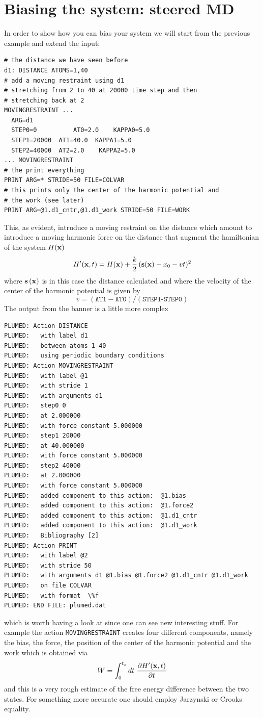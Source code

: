 \documentclass[10pt,fleqn,a4paper]{report}
\begin{document}
\chapter{Biasing the system: steered MD}
In order to show how you can bias your system we will start from the previous example and extend the input:
\begin{verbatim}
# the distance we have seen before
d1: DISTANCE ATOMS=1,40
# add a moving restraint using d1
# stretching from 2 to 40 at 20000 time step and then 
# stretching back at 2
MOVINGRESTRAINT ...
  ARG=d1
  STEP0=0          AT0=2.0    KAPPA0=5.0
  STEP1=20000  AT1=40.0  KAPPA1=5.0
  STEP2=40000  AT2=2.0    KAPPA2=5.0
... MOVINGRESTRAINT
# the print everything
PRINT ARG=* STRIDE=50 FILE=COLVAR
# this prints only the center of the harmonic potential and 
# the work (see later)
PRINT ARG=@1.d1_cntr,@1.d1_work STRIDE=50 FILE=WORK
\end{verbatim}
This, as evident, intruduce a moving restraint on the distance which amount to introduce a moving harmonic force on the distance that augment the hamiltonian of the system $H({\bf x})$
\begin{equation}
H'({\bf x},t)=H({\bf x})+\frac{k}{2}\left(\bf{s}({\bf x}\right) - x_0 -v t)^2
\end{equation}
where $\bf{s} \left( {\bf x} \right)$ is in this case the distance calculated and where the velocity of the center of the harmonic potential is given by
\begin{equation}
v= (\texttt{AT1}-\texttt{AT0})/(\texttt{STEP1-STEP0})
\end{equation}
The output from the banner is a little more complex
\begin{verbatim}
PLUMED: Action DISTANCE
PLUMED:   with label d1
PLUMED:   between atoms 1 40
PLUMED:   using periodic boundary conditions
PLUMED: Action MOVINGRESTRAINT
PLUMED:   with label @1
PLUMED:   with stride 1
PLUMED:   with arguments d1
PLUMED:   step0 0
PLUMED:   at 2.000000
PLUMED:   with force constant 5.000000
PLUMED:   step1 20000
PLUMED:   at 40.000000
PLUMED:   with force constant 5.000000
PLUMED:   step2 40000
PLUMED:   at 2.000000
PLUMED:   with force constant 5.000000
PLUMED:   added component to this action:  @1.bias
PLUMED:   added component to this action:  @1.force2
PLUMED:   added component to this action:  @1.d1_cntr
PLUMED:   added component to this action:  @1.d1_work
PLUMED:   Bibliography [2]
PLUMED: Action PRINT
PLUMED:   with label @2
PLUMED:   with stride 50
PLUMED:   with arguments d1 @1.bias @1.force2 @1.d1_cntr @1.d1_work
PLUMED:   on file COLVAR
PLUMED:   with format  \%f
PLUMED: END FILE: plumed.dat
\end{verbatim}
which is worth having a look at since one can see new interesting stuff.
For example the action \texttt{MOVINGRESTRAINT} creates four different components, namely the bias, the force, the position of the center of the harmonic potential and the work which is obtained via
\begin{eqnarray}
W=\int_0^{t_s}dt\ \frac{\partial H'({\bf x},t)}{\partial t}
\end{eqnarray}
and this is a very rough estimate of the free energy difference between the two states. 
For something more accurate one should employ Jarzynski or Crooks equality.
\end{document}
